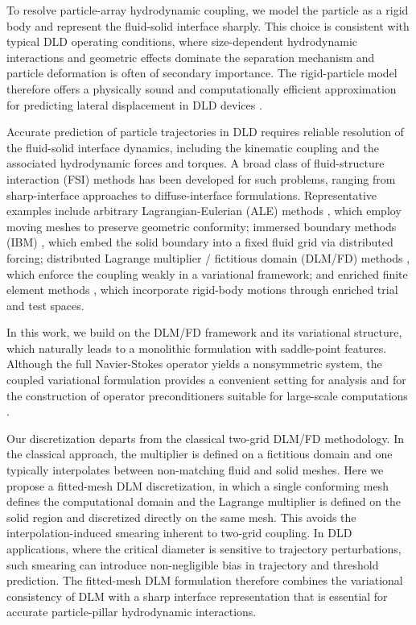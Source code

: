\documentclass{article}
\begin{document}
To resolve particle-array hydrodynamic coupling, we model the particle as a rigid body and represent the fluid-solid interface sharply. This choice is consistent with typical DLD operating conditions, where size-dependent hydrodynamic interactions and geometric effects dominate the separation mechanism and particle deformation is often of secondary importance. The rigid-particle model therefore offers a physically sound and computationally efficient approximation for predicting lateral displacement in DLD devices \cite{rezaei2021numerical,tang2022topology,murmura2019space}.

Accurate prediction of particle trajectories in DLD requires reliable resolution of the fluid-solid interface dynamics, including the kinematic coupling and the associated hydrodynamic forces and torques. A broad class of fluid-structure interaction (FSI) methods has been developed for such problems, ranging from sharp-interface approaches to diffuse-interface formulations. Representative examples include arbitrary Lagrangian-Eulerian (ALE) methods \cite{hirt1974arbitrary,hughes1981lagrangian,xu2015well,li2021energy}, which employ moving meshes to preserve geometric conformity; immersed boundary methods (IBM) \cite{peskin2002immersed,boffi2015finite,boffi2018distributed}, which embed the solid boundary into a fixed fluid grid via distributed forcing; distributed Lagrange multiplier / fictitious domain (DLM/FD) methods \cite{boffi2022existence,boffi2021existence,glowinski1999distributed,glowinski2001fictitious}, which enforce the coupling weakly in a variational framework; and enriched finite element methods \cite{hollbacher2019rotational,hollbacher2020gradient,hollbacher2021sharp}, which incorporate rigid-body motions through enriched trial and test spaces.


In this work, we build on the DLM/FD framework and its variational structure, which naturally leads to a monolithic formulation with saddle-point features. Although the full Navier-Stokes operator yields a nonsymmetric system, the coupled variational formulation provides a convenient setting for analysis and for the construction of operator preconditioners suitable for large-scale computations \cite{boffi2021existence,boffi2022existence,wang2017fictitious,wang2021augmented}.


Our discretization departs from the classical two-grid DLM/FD methodology. In the classical approach, the multiplier is defined on a fictitious domain and one typically interpolates between non-matching fluid and solid meshes. Here we propose a fitted-mesh DLM discretization, in which a single conforming mesh defines the computational domain and the Lagrange multiplier is defined on the solid region and discretized directly on the same mesh. This avoids the interpolation-induced smearing inherent to two-grid coupling. In DLD applications, where the critical diameter is sensitive to trajectory perturbations, such smearing can introduce non-negligible bias in trajectory and threshold prediction. The fitted-mesh DLM formulation therefore combines the variational consistency of DLM with a sharp interface representation that is essential for accurate particle-pillar  hydrodynamic  interactions.
\end{document}
